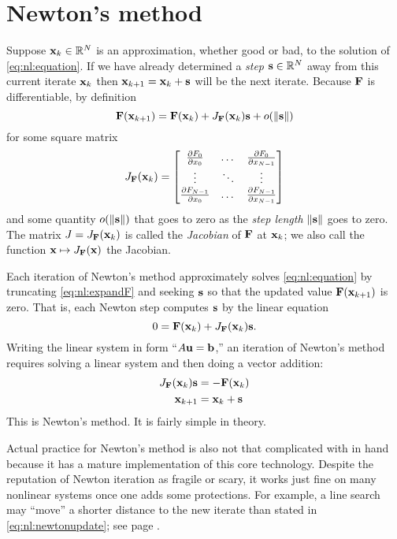 \section{Newton's method}

Suppose $\mathbf{x}_k\in\mathbb{R}^N$ is an approximation, whether good or bad, to the solution of \eqref{eq:nl:equation}.  If we have already determined a \emph{step} $\mathbf{s}\in\mathbb{R}^N$ away from this current iterate $\mathbf{x}_k$ then $\mathbf{x}_{k+1} = \mathbf{x}_k + \mathbf{s}$ will be the next iterate.  Because $\mathbf{F}$ is differentiable, by definition
\begin{equation}
    \mathbf{F}(\mathbf{x}_{k+1}) = \mathbf{F}(\mathbf{x}_k) + J_{\mathbf{F}}(\mathbf{x}_k) \mathbf{s} + o(\|\mathbf{s}\|)  \label{eq:nl:expandF}
\end{equation}
for some square matrix
\begin{equation}
J_{\mathbf{F}}(\mathbf{x}_k) = \begin{bmatrix}
    \frac{\partial F_0}{\partial x_0} & \dots & \frac{\partial F_0}{\partial x_{N-1}} \\
    \vdots & \ddots & \vdots \\
    \frac{\partial F_{N-1}}{\partial x_0} & \dots & \frac{\partial F_{N-1}}{\partial x_{N-1}}  \end{bmatrix}  \label{eq:nl:jacdefn}
\end{equation}
and some quantity $o(\|\mathbf{s}\|)$ that goes to zero as the \emph{step length} $\|\mathbf{s}\|$ goes to zero.  The matrix $J = J_{\mathbf{F}}(\mathbf{x}_k)$ is called the \emph{Jacobian} of $\mathbf{F}$ at $\mathbf{x}_k$; we also call the function $\mathbf{x} \mapsto J_{\mathbf{F}}(\mathbf{x})$ the Jacobian.

Each iteration of Newton's method approximately solves \eqref{eq:nl:equation} by truncating \eqref{eq:nl:expandF} and seeking $\mathbf{s}$ so that the updated value $\mathbf{F}(\mathbf{x}_{k+1})$ is zero.  That is, each Newton step computes $\mathbf{s}$ by the linear equation
\begin{equation}
    0 = \mathbf{F}(\mathbf{x}_k) + J_{\mathbf{F}}(\mathbf{x}_k) \mathbf{s}.
\end{equation}
Writing the linear system in form ``$A\mathbf{u}=\mathbf{b}$,'' an iteration of Newton's method requires solving a linear system and then doing a vector addition:
\begin{align}
    J_{\mathbf{F}}(\mathbf{x}_k) \mathbf{s} &= - \mathbf{F}(\mathbf{x}_k)  \label{eq:nl:newtoneq}  \\
    \mathbf{x}_{k+1} &= \mathbf{x}_k + \mathbf{s}  \label{eq:nl:newtonupdate}
\end{align}
This is Newton's method.  It is fairly simple in theory.

Actual practice for Newton's method is also not that complicated with \PETSc in hand because it has a mature implementation of this core technology.  Despite the reputation of Newton iteration as fragile or scary, it works just fine on many nonlinear systems once one adds some protections.  For example, a line search may ``move'' a shorter distance to the new iterate than stated in \eqref{eq:nl:newtonupdate}; see page \pageref{sec:linesearch}.

